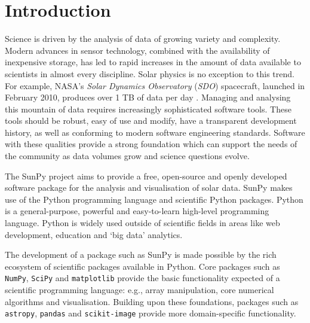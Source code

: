 \section{Introduction}\label{sec:Intro}

Science is driven by the analysis of data of growing variety and complexity.
Modern advances in sensor
technology, combined with the availability of inexpensive storage, has led to
rapid increases in the amount of data available to scientists in almost
every discipline.  Solar physics is no exception to this trend. For example,
NASA's \textit{Solar Dynamics Observatory} (\textit{SDO}) spacecraft, launched 
in February 2010, produces over 1 TB of data per day \citep{aia}. Managing and
analysing this mountain of data requires increasingly sophisticated software 
tools.
These tools should be robust, easy of use and modify, have a transparent 
development history, as well as conforming to modern software engineering 
standards.
Software with these qualities provide a strong foundation which can support the 
needs of the community as data volumes grow and science questions evolve.

The SunPy project aims to provide a free, open-source and openly developed 
software package for the analysis and visualisation of solar data. SunPy makes 
use of the Python programming language and scientific Python packages. Python 
is a general-purpose, powerful and easy-to-learn high-level programming 
language.
Python is widely used outside of scientific fields in areas like web development, 
education and `big data' analytics.

The development of a package such as SunPy is made possible by the 
rich ecosystem of scientific packages available in Python. Core packages such 
as \texttt{NumPy}, \texttt{SciPy} and \texttt{matplotlib} 
provide the basic functionality expected of a scientific programming language:
e.g., array manipulation, core numerical algorithms and visualisation. 
Building upon these foundations, packages such as \texttt{astropy}, \texttt{pandas} and 
\texttt{scikit-image} provide more domain-specific functionality.

